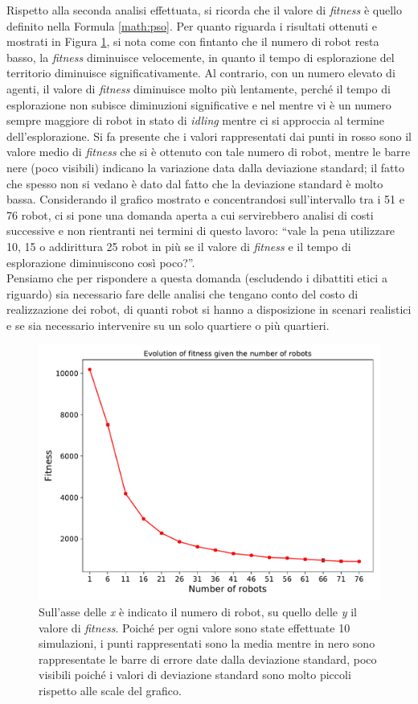Rispetto alla seconda analisi effettuata, si ricorda che il valore di \textit{fitness} è quello definito nella Formula \ref{math:pso}.
Per quanto riguarda i risultati ottenuti e mostrati in Figura \ref{fig:fitness}, si nota come con fintanto che il numero di robot resta basso, la \textit{fitness} diminuisce velocemente, in quanto il tempo di esplorazione del territorio diminuisce significativamente. Al contrario, con un numero elevato di agenti, il valore di \textit{fitness} diminuisce molto più lentamente, perché il tempo di esplorazione non subisce diminuzioni significative e nel mentre vi è un numero sempre maggiore di robot in stato di \textit{idling} mentre ci si approccia al termine dell'esplorazione.
Si fa presente che i valori rappresentati dai punti in rosso sono il valore medio di \textit{fitness} che si è ottenuto con tale numero di robot, mentre le barre nere (poco visibili) indicano la variazione data dalla deviazione standard; il fatto che spesso non si vedano è dato dal fatto che la deviazione standard è molto bassa.
Considerando il grafico mostrato e concentrandosi sull'intervallo tra i 51 e 76 robot, ci si pone una domanda aperta a cui servirebbero analisi di costi successive e non rientranti nei termini di questo lavoro: “vale la pena utilizzare 10, 15 o addirittura 25 robot in più se il valore di \textit{fitness} e il tempo di esplorazione diminuiscono così poco?”.\\
Pensiamo che per rispondere a questa domanda (escludendo i dibattiti etici a riguardo) sia necessario fare delle analisi che tengano conto del costo di realizzazione dei robot, di quanti robot si hanno a disposizione in scenari realistici e se sia necessario intervenire su un solo quartiere o più quartieri.
\begin{figure}
	\centering
	\includegraphics[width=0.9\linewidth]{images/macro_results/fitness}
	\caption{Sull'asse delle \textit{x} è indicato il numero di robot, su quello delle \textit{y} il valore di \textit{fitness}. Poiché per ogni valore sono state effettuate 10 simulazioni, i punti rappresentati sono la media mentre in nero sono rappresentate le barre di errore date dalla deviazione standard, poco visibili poiché i valori di deviazione standard sono molto piccoli rispetto alle scale del grafico.}
	\label{fig:fitness}
\end{figure}

